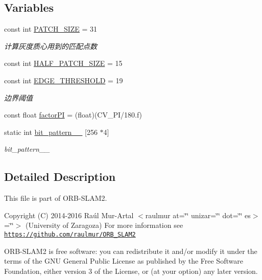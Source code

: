 \subsection*{Variables}
\begin{DoxyCompactItemize}
\item 
const int \mbox{\hyperlink{namespace_o_r_b___s_l_a_m2_a557e5c298c5f7164667f083494c2197a}{P\+A\+T\+C\+H\+\_\+\+S\+I\+ZE}} = 31
\begin{DoxyCompactList}\small\item\em 计算灰度质心用到的匹配点数 \end{DoxyCompactList}\item 
const int \mbox{\hyperlink{namespace_o_r_b___s_l_a_m2_aa09849ae679bf2392b097abd710d8d7f}{H\+A\+L\+F\+\_\+\+P\+A\+T\+C\+H\+\_\+\+S\+I\+ZE}} = 15
\item 
const int \mbox{\hyperlink{namespace_o_r_b___s_l_a_m2_aec00f1ad4dea35755e3af4404282cd3b}{E\+D\+G\+E\+\_\+\+T\+H\+R\+E\+S\+H\+O\+LD}} = 19
\begin{DoxyCompactList}\small\item\em 边界阈值 \end{DoxyCompactList}\item 
const float \mbox{\hyperlink{namespace_o_r_b___s_l_a_m2_a8015b470ffeb885a0c90837a03b3210f}{factor\+PI}} = (float)(C\+V\+\_\+\+PI/180.f)
\item 
static int \mbox{\hyperlink{namespace_o_r_b___s_l_a_m2_a8dd21ee063eca2b0bc3f5e76ceba0492}{bit\+\_\+pattern\+\_\+\_\+}} \mbox{[}256 $\ast$4\mbox{]}
\begin{DoxyCompactList}\small\item\em bit\+\_\+pattern\+\_\+\_\+ \end{DoxyCompactList}\end{DoxyCompactItemize}


\subsection{Detailed Description}
This file is part of O\+R\+B-\/\+S\+L\+A\+M2.

Copyright (C) 2014-\/2016 Raúl Mur-\/\+Artal $<$raulmur at=\char`\"{}\char`\"{} unizar=\char`\"{}\char`\"{} dot=\char`\"{}\char`\"{} es$>$=\char`\"{}\char`\"{}$>$ (University of Zaragoza) For more information see \href{https://github.com/raulmur/ORB_SLAM2}{\tt https\+://github.\+com/raulmur/\+O\+R\+B\+\_\+\+S\+L\+A\+M2}

O\+R\+B-\/\+S\+L\+A\+M2 is free software\+: you can redistribute it and/or modify it under the terms of the G\+NU General Public License as published by the Free Software Foundation, either version 3 of the License, or (at your option) any later version.

